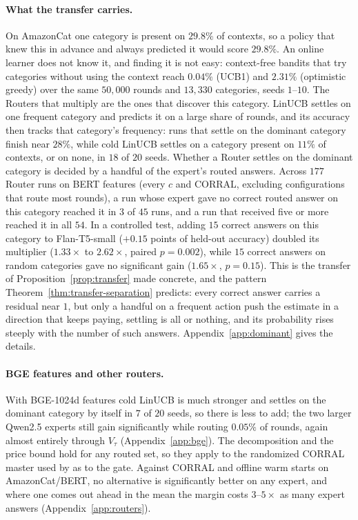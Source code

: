 \documentclass{article}
\theoremstyle{definition}
\theoremstyle{remark}
\theoremstyle{remark}
\begin{document}
\paragraph{What the transfer carries.} On AmazonCat one category is present on
$29.8\%$ of contexts, so a policy that knew this in advance and always
predicted it would score $29.8\%$. An online learner does not know it, and
finding it is not easy: context-free bandits that try categories without
using the context reach $0.04\%$ (UCB1) and $2.31\%$ (optimistic greedy) over
the same $50{,}000$ rounds and $13{,}330$ categories, seeds $1$--$10$. The
Routers that multiply are the ones that discover this category. LinUCB
settles on one frequent category and predicts it on a large share of rounds,
and its accuracy then tracks that category's frequency: runs that settle on
the dominant category finish near $28\%$, while cold LinUCB settles on a
category present on $11\%$ of contexts, or on none, in $18$ of $20$ seeds.
Whether a Router settles on the dominant category is decided by a handful of
the expert's routed answers. Across $177$ Router runs on BERT features (every
$c$ and CORRAL, excluding configurations that route most rounds), a run whose
expert gave no correct routed answer on this category reached it in $3$ of
$45$ runs, and a run that received five or more reached it in all $54$. In a
controlled test, adding $15$ correct answers on this category to
Flan-T5-small ($+0.15$ points of held-out accuracy) doubled its multiplier
($1.33\times$ to $2.62\times$, paired $p=0.002$), while $15$ correct answers on
random categories gave no significant gain ($1.65\times$, $p=0.15$). This is
the transfer of Proposition~\ref{prop:transfer} made concrete, and the pattern
Theorem~\ref{thm:transfer-separation} predicts: every correct answer carries a
residual near $1$, but only a handful on a frequent action push the estimate
in a direction that keeps paying, settling is all or nothing, and its
probability rises steeply with the number of such answers. Appendix~\ref{app:dominant} gives
the details.

\paragraph{BGE features and other routers.}
With BGE-1024d features cold LinUCB is much stronger and settles on the
dominant category by itself in $7$ of $20$ seeds, so there is less to add; the
two larger Qwen2.5 experts still gain significantly while routing $0.05\%$ of
rounds, again almost entirely through $V_\tau$ (Appendix~\ref{app:bge}). The
decomposition and the price bound hold for any routed set, so they apply to
the randomized CORRAL master \cite{agarwal2017corralling} used by
\cite{chen2024llmdecision} as to the gate. Against CORRAL and offline warm
starts on AmazonCat/BERT, no alternative is significantly better on any
expert, and where one comes out ahead in the mean the margin costs $3$--$5\times$
as many expert answers (Appendix~\ref{app:routers}).
\end{document}
